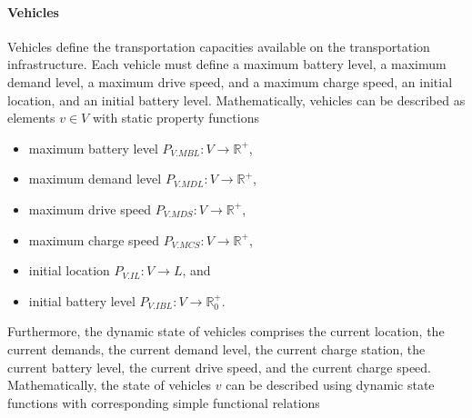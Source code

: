\documentclass{article}
\begin{document}
    \paragraph{Vehicles}
    Vehicles define the transportation capacities available on the transportation infrastructure.
    Each vehicle must define a maximum battery level, a maximum demand level, a maximum drive speed, and a maximum charge speed, an initial location, and an initial battery level.
    Mathematically, vehicles can be described as elements $v \in V$ with static property functions
    \begin{itemize}
        \item maximum battery level $P_{V.MBL}: V \rightarrow \mathbb{R}^+$,
        \item maximum demand level $P_{V.MDL}: V \rightarrow \mathbb{R}^+$,
        \item maximum drive speed $P_{V.MDS}: V \rightarrow \mathbb{R}^+$,
        \item maximum charge speed $P_{V.MCS}: V \rightarrow \mathbb{R}^+$,
        \item initial location $P_{V.IL}: V \rightarrow L$, and
        \item initial battery level $P_{V.IBL}: V \rightarrow \mathbb{R}_0^+$.
    \end{itemize}
    Furthermore, the dynamic state of vehicles comprises the current location, the current demands, the current demand level, the current charge station, the current battery level, the current drive speed, and the current charge speed.
    Mathematically, the state of vehicles $v$ can be described using dynamic state functions with corresponding simple functional relations
\end{document}
